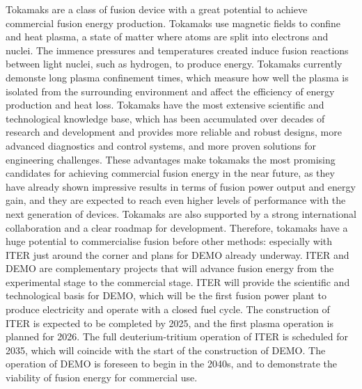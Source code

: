 Tokamaks are a class of fusion device with a great potential to achieve commercial fusion energy production. Tokamaks use magnetic fields to confine and heat plasma, a state of matter where atoms are split into electrons and nuclei. The immence pressures and temperatures created induce fusion reactions between light nuclei, such as hydrogen, to produce energy. Tokamaks currently demonste long plasma confinement times, which measure how well the plasma is isolated from the surrounding environment and affect the efficiency of energy production and heat loss. Tokamaks have the most extensive scientific and technological knowledge base, which has been accumulated over decades of research and development and provides more reliable and robust designs, more advanced diagnostics and control systems, and more proven solutions for engineering challenges. These advantages make tokamaks the most promising candidates for achieving commercial fusion energy in the near future, as they have already shown impressive results in terms of fusion power output and energy gain, and they are expected to reach even higher levels of performance with the next generation of devices. Tokamaks are also supported by a strong international collaboration and a clear roadmap for development. Therefore, tokamaks have a huge potential to commercialise fusion before other methods: especially with ITER just around the corner and plans for DEMO already underway. ITER and DEMO are complementary projects that will advance fusion energy from the experimental stage to the commercial stage. ITER will provide the scientific and technological basis for DEMO, which will be the first fusion power plant to produce electricity and operate with a closed fuel cycle. The construction of ITER is expected to be completed by 2025, and the first plasma operation is planned for 2026. The full deuterium-tritium operation of ITER is scheduled for 2035, which will coincide with the start of the construction of DEMO. The operation of DEMO is foreseen to begin in the 2040s, and to demonstrate the viability of fusion energy for commercial use.

